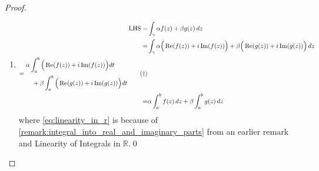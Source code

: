 \documentclass[11pt, oneside]{book}
\begin{document}
\begin{proof}
	\begin{enumerate}
		\item \begin{align*}
			\text{LHS}=&\int_{\gamma} \alpha f(z) + \beta g(z) \mathop{}\!d{z} \\
				= &\int_{\gamma} \alpha \Big( \operatorname{Re}(f(z)) + i \operatorname{Im}(f(z)) \Big) + \beta \Big( \operatorname{Re}(g(z)) + i \operatorname{Im}(g(z)) \Big) \mathop{}\!d{z} \\
				= \begin{split}
					&\alpha \int_{a}^{b} \Big( \operatorname{Re}(f(z)) + i \operatorname{Im}(f(z)) \Big) dt \\
					&\quad + \beta \int_{a}^{b} \Big( \operatorname{Re}(g(z)) + i \operatorname{Im}(g(z)) \Big) dt
				\end{split} \tag{$\dagger$}\label{eq:linearity_in_r} \\
				= & \alpha \int_{a}^{b} f(z) \mathop{}\!d{z} + \beta \int_{a}^{b} g(z) \mathop{}\!d{z}
			\end{align*}
			where \eqref{eq:linearity_in_r} is because of \cref{remark:integral_into_real_and_imaginary_parts} from an earlier remark and Linearity of Integrals in $\mathbb{R}$.\qed


\end{enumerate}
\end{proof}
\end{document}
